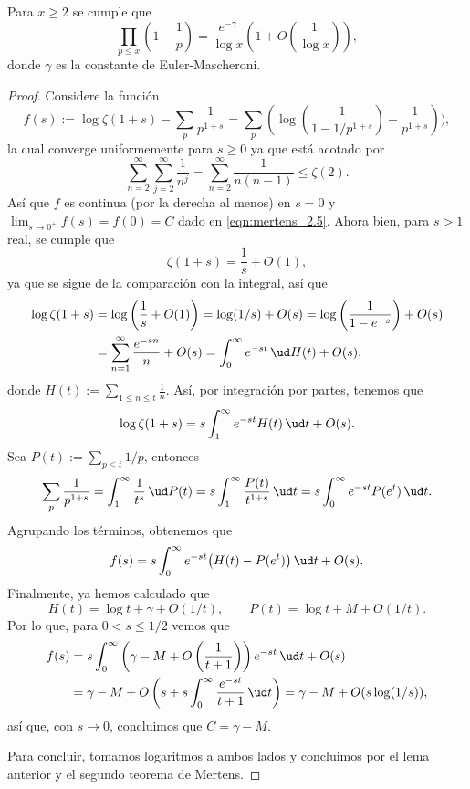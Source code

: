 \documentclass[teoria-numeros.tex]{subfiles}
\begin{document}
\begin{thmi}
	Para $x \ge 2$ se cumple que
	\[
		\prod_{p\le x} \left( 1 - \frac{1}{p} \right) = \frac{e^{-\gamma}}{\log x}\left( 1 + O\left( \frac{1}{\log x} \right) \right),
	\]
	donde $\gamma$ es la constante de Euler-Mascheroni.
\end{thmi}
\begin{proof}
	Considere la función
	\[
		f(s) := \log\zeta(1 + s) - \sum_{p} \frac{1}{p^{1+s}} = \sum_{p} \left( \log\left( \frac{1}{1 - 1/p^{1+s}} \right) - \frac{1}{p^{1+s}} \right) ),
	\]
	la cual converge uniformemente para $s \ge 0$ ya que está acotado por
	\[
		\sum_{n=2}^{\infty} \sum_{j=2}^{\infty} \frac{1}{n^j} = \sum_{n=2}^{\infty} \frac{1}{n(n-1)} \le \zeta(2).
	\]
	Así que $f$ es continua (por la derecha al menos) en $s = 0$ y $\lim_{s \to 0^+} f(s) = f(0) = C$ dado en \eqref{eqn:mertens_2.5}.
	Ahora bien, para $s > 1$ real, se cumple que
	\[
		\zeta(1 + s) = \frac{1}{s} + O(1),
	\]
	ya que se sigue de la comparación con la integral, así que
	\begin{align*}
		\log\zeta(1 + s) &= \log\left( \frac{1}{s} + O(1) \right) = \log(1/s) + O(s) = \log\left( \frac{1}{1 - e^{-s}} \right) + O(s) \\
				 &= \sum_{n=1}^{\infty} \frac{e^{-sn}}{n} + O(s) = \int_{0}^{\infty} e^{-st} \, \ud H(t) + O(s),
	\end{align*}
	donde $H(t) := \sum_{1\le n\le t} \frac{1}{n}$.
	Así, por integración por partes, tenemos que
	\[
		\log\zeta(1+s) = s \int_{1}^{\infty} e^{-st}H(t) \, \ud t + O(s).
	\]
	Sea $P(t) := \sum_{p\le t} 1/p$, entonces
	\[
		\sum_{p} \frac{1}{p^{1+s}} = \int_{1}^{\infty} \frac{1}{t^s} \, \ud P(t) = s \int_{1}^{\infty} \frac{P(t)}{t^{1+s}} \, \ud t
		= s \int_{0}^{\infty} e^{-st} P(e^t) \, \ud t.
	\]
	Agrupando los términos, obtenemos que
	\[
		f(s) = s \int_{0}^{\infty} e^{-st}\big( H(t) - P(e^t) \big) \, \ud t + O(s).
	\]
	Finalmente, ya hemos calculado que
	\[
		H(t) = \log t + \gamma + O(1/t), \qquad P(t) = \log t + M + O(1/t).
	\]
	Por lo que, para $0 < s \le 1/2$ vemos que
	\begin{align*}
		f(s) &= s \int_{0}^{\infty} \left( \gamma - M + O\left( \frac{1}{t+1} \right) \right)e^{-st} \, \ud t + O(s) \\
		     &= \gamma - M + O\left( s + s \int_{0}^{\infty} \frac{e^{-st}}{t + 1} \, \ud t \right) = \gamma - M + O(s\log(1/s)),
	\end{align*}
	así que, con $s \to 0$, concluimos que $C = \gamma - M$.

	Para concluir, tomamos logaritmos a ambos lados y concluimos por el lema anterior y el segundo teorema de Mertens.
\end{proof}
\end{document}
